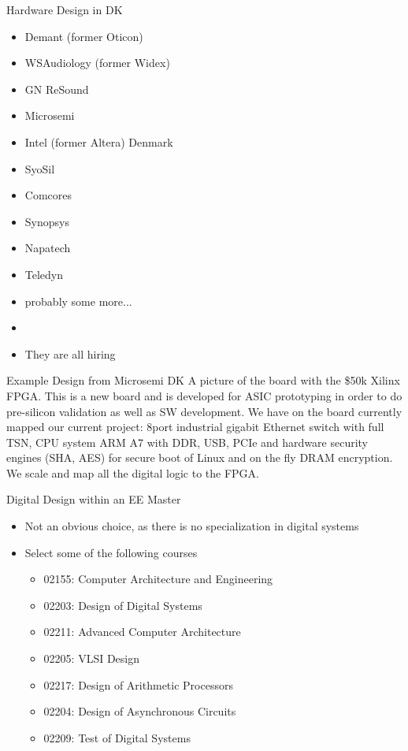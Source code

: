 \begin{frame}[fragile]{Hardware Design in DK}
\begin{itemize}
\item Demant (former Oticon)
\item WSAudiology (former Widex)
\item GN ReSound
\item Microsemi
\item Intel (former Altera) Denmark
\item SyoSil
\item Comcores
\item Synopsys
\item Napatech
\item Teledyn
\item probably some more...
\item 
\item They are all hiring
\end{itemize}
\end{frame}

\begin{frame}[fragile]{Example Design from Microsemi DK}
A picture of the board with the \$50k Xilinx FPGA. This is a new board and is developed for ASIC prototyping in order to do pre-silicon validation as well as SW development. We have on the board currently mapped our current project: 8port industrial gigabit Ethernet switch with full TSN, CPU system ARM A7 with DDR, USB, PCIe and hardware security engines (SHA, AES) for secure boot of Linux and on the fly DRAM encryption. We scale and map all the digital logic to the FPGA.
\end{frame}

\begin{frame}[fragile]{Digital Design within an EE Master}
\begin{itemize}
\item Not an obvious choice, as there is no specialization in digital systems
\item Select some of the following courses
\begin{itemize}
\item 02155: Computer Architecture and Engineering
\item 02203: Design of Digital Systems
\item 02211: Advanced Computer Architecture
\item 02205: VLSI Design
\item 02217: Design of Arithmetic Processors
\item 02204: Design of Asynchronous Circuits
\item 02209: Test of Digital Systems
\end{itemize}
\end{itemize}
\end{frame}

